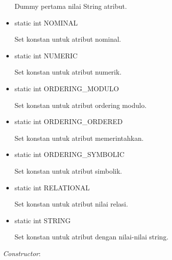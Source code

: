 \begin{itemize}
	Dummy pertama nilai String atribut.
	
	\item static int NOMINAL
	
	Set konstan untuk atribut nominal.
	
	\item static int NUMERIC
	
	Set konstan untuk atribut numerik.
	
	\item static int ORDERING\_MODULO
	
	Set konstan untuk atribut ordering modulo.
	
	\item static int ORDERING\_ORDERED
	
	Set konstan untuk atribut memerintahkan.
	
	\item static int ORDERING\_SYMBOLIC
	
	Set konstan untuk atribut simbolik.
	
	\item static int RELATIONAL
	
	Set konstan untuk atribut nilai relasi.
	
	\item static int STRING
	
	Set konstan untuk atribut dengan nilai-nilai string.
\end{itemize}
\textsl{Constructor}:
